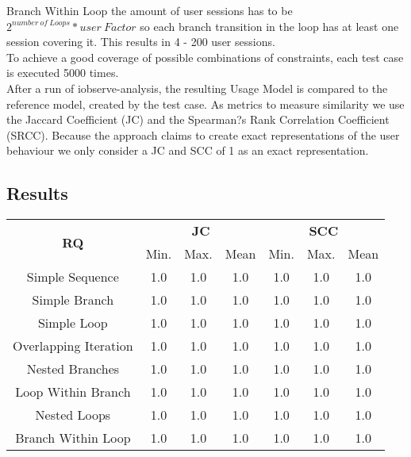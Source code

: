 \documentclass[10pt,a4paper]{article}
\begin{document}
	Branch Within Loop the amount of user sessions has to be $2^{number\ of\ Loops} * user\ Factor$ so each branch transition in the loop has at least one session covering it. This results in 4 - 200 user sessions.\\
	To achieve a good coverage of possible combinations of constraints, each test case is executed 5000 times.\\
	After a run of iobserve-analysis, the resulting Usage Model is compared to the reference model, created by the test case. As metrics to measure similarity we use the Jaccard Coefficient (JC) and the Spearman?s Rank Correlation Coefficient (SRCC). Because the approach claims to create exact representations of the user behaviour we only consider a JC and SCC of 1 as an exact representation.
	\subsection{Results}
	\begin{table}[H]
		\centering
		\begin{tabular}{|c||c|c|c||c|c|c|}
			\hline
			\multirow{2}{*}{\textbf{RQ}}
			 & \multicolumn{3}{c||}{\textbf{JC}} & \multicolumn{3}{c|}{\textbf{SCC}} \\
			 \cline{2-7}
			 & Min. & Max. & Mean & Min. & Max. & Mean \\
			\hhline{|=======|}
			Simple Sequence & 1.0 & 1.0 & 1.0 & 1.0 & 1.0 & 1.0 \\
			\hline
			Simple Branch & 1.0 & 1.0 & 1.0 & 1.0 & 1.0 & 1.0 \\
			\hline
			Simple Loop & 1.0 & 1.0 & 1.0 & 1.0 & 1.0 & 1.0 \\
			\hline
			Overlapping Iteration & 1.0 & 1.0 & 1.0 & 1.0 & 1.0 & 1.0 \\
			\hline
			Nested Branches & 1.0 & 1.0 & 1.0 & 1.0 & 1.0 & 1.0 \\
			\hline
			Loop Within Branch & 1.0 & 1.0 & 1.0 & 1.0 & 1.0 & 1.0 \\
			\hline
			Nested Loops & 1.0 & 1.0 & 1.0 & 1.0 & 1.0 & 1.0 \\
			\hline
			Branch Within Loop & 1.0 & 1.0 & 1.0 & 1.0 & 1.0 & 1.0 \\
			\hline
		\end{tabular}
	\end{table}
\end{document}
